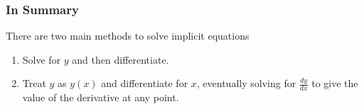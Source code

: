 \documentclass{ximera}
\begin{document}
\subsubsection{In Summary}
There are two main methods to solve implicit equations 
\begin{enumerate}
\item{Solve for $y$ and then differentiate.}
\item{Treat $y$ as $y(x)$ and differentiate for $x$, eventually solving for $\frac{dy}{dx}$ to give the value of the derivative at any point.}
\end{enumerate}
\pagebreak
\end{document}
